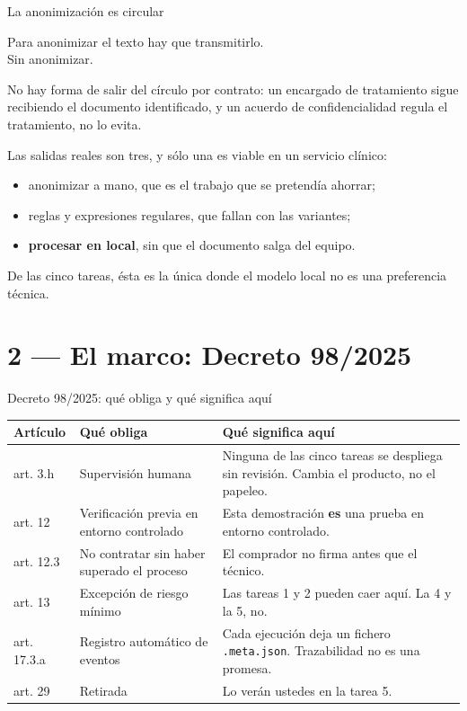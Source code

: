 \documentclass[aspectratio=169,11pt]{beamer}
\begin{document}
\begin{frame}{La anonimización es circular}
  \begin{center}
    \alert{\large Para anonimizar el texto hay que transmitirlo.}\\[.2em]
    \alert{\large Sin anonimizar.}
  \end{center}
  \vspace{.7em}
  \small
  No hay forma de salir del círculo por contrato: un encargado de tratamiento
  sigue recibiendo el documento identificado, y un acuerdo de confidencialidad
  regula el tratamiento, no lo evita.
  \vspace{.5em}

  Las salidas reales son tres, y sólo una es viable en un servicio clínico:
  \begin{itemize}\small
    \item anonimizar a mano, que es el trabajo que se pretendía ahorrar;
    \item reglas y expresiones regulares, que fallan con las variantes;
    \item \textbf{procesar en local}, sin que el documento salga del equipo.
  \end{itemize}
  \vspace{.4em}
  \centering\footnotesize De las cinco tareas, ésta es la única donde el modelo
  local no es una preferencia técnica.
\end{frame}

\section{2 — El marco: Decreto 98/2025}

\begin{frame}{Decreto 98/2025: qué obliga y qué significa aquí}
  \footnotesize
  \begin{tabular}{@{}p{2.1cm}p{4.3cm}p{5.6cm}@{}}
    \toprule
    \textbf{Artículo} & \textbf{Qué obliga} & \textbf{Qué significa aquí} \\
    \midrule
    art. 3.h & Supervisión humana & Ninguna de las cinco tareas se despliega sin revisión. Cambia el producto, no el papeleo. \\[.15em]
    art. 12 & Verificación previa en entorno controlado & Esta demostración \textbf{es} una prueba en entorno controlado. \\[.15em]
    art. 12.3 & No contratar sin haber superado el proceso & El comprador no firma antes que el técnico. \\[.15em]
    art. 13 & Excepción de riesgo mínimo & Las tareas 1 y 2 pueden caer aquí. La 4 y la 5, no. \\[.15em]
    art. 17.3.a & Registro automático de eventos & Cada ejecución deja un fichero \texttt{.meta.json}. Trazabilidad no es una promesa. \\[.15em]
    art. 29 & Retirada & Lo verán ustedes en la tarea 5. \\
    \bottomrule
  \end{tabular}
\end{frame}
\end{document}
